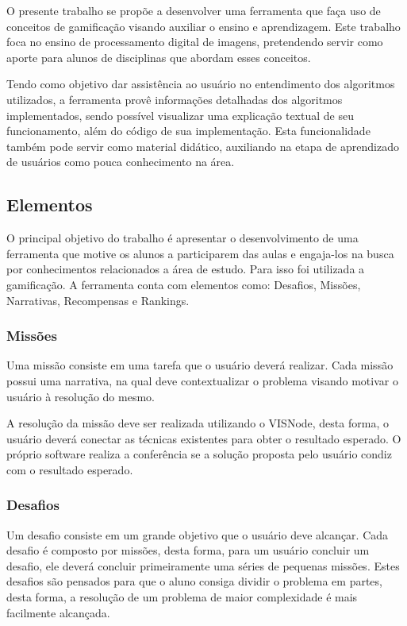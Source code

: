 \documentclass[
	12pt,				%
	oneside,			%
	a4paper,			%
	english,			%
	french,				%
	spanish,			%
	brazil,				%
	]{abntex2}
\begin{document}
O presente trabalho se propõe a desenvolver uma ferramenta que faça uso de conceitos de gamificação visando auxiliar o ensino e aprendizagem. Este trabalho foca no ensino de processamento digital de imagens, pretendendo servir como aporte para alunos de disciplinas que abordam esses conceitos.

Tendo como objetivo dar assistência ao usuário no entendimento dos algoritmos utilizados, a ferramenta provê informações detalhadas dos algoritmos implementados, sendo possível visualizar uma explicação textual de seu funcionamento, além do código de sua implementação. Esta funcionalidade também pode servir como material didático, auxiliando na etapa de aprendizado de usuários como pouca conhecimento na área.

\subsection{Elementos}

O principal objetivo do trabalho é apresentar o desenvolvimento de uma ferramenta que motive os alunos a participarem das aulas e engaja-los na busca por conhecimentos relacionados a área de estudo. Para isso foi utilizada a gamificação. A ferramenta conta com elementos como: Desafios, Missões, Narrativas, Recompensas e Rankings.

\subsubsection{Missões}

Uma missão consiste em uma tarefa que o usuário deverá realizar. Cada missão possui uma narrativa, na qual deve contextualizar o problema visando motivar o usuário à resolução do mesmo.

A resolução da missão deve ser realizada utilizando o VISNode, desta forma, o usuário deverá conectar as técnicas existentes para obter o resultado esperado. O próprio software realiza a conferência se a solução proposta pelo usuário condiz com o resultado esperado.

\subsubsection{Desafios}
\label{desafio:moedas}
Um desafio consiste em um grande objetivo que o usuário deve alcançar. Cada desafio é composto por missões, desta forma, para um usuário concluir um desafio, ele deverá concluir primeiramente uma séries de pequenas missões. Estes desafios são pensados para que o aluno consiga dividir o problema em partes, desta forma, a resolução de um problema de maior complexidade é mais facilmente alcançada.
\end{document}
